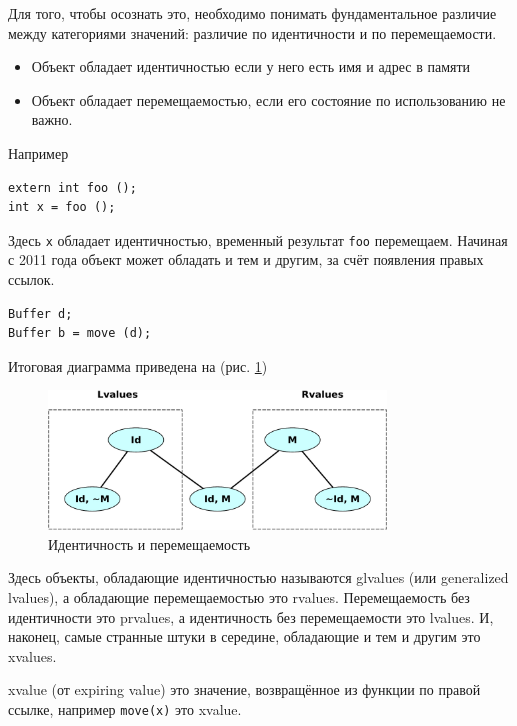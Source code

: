\documentclass[a4paper,12pt,oneside]{article}
\begin{document}
Для того, чтобы осознать это, необходимо понимать фундаментальное различие между категориями значений: различие по идентичности и по перемещаемости.

\begin{itemize}
\item Объект обладает идентичностью если у него есть имя и адрес в памяти
\item Объект обладает перемещаемостью, если его состояние по использованию не важно.
\end{itemize}

Например

\begin{lstlisting}
extern int foo ();
int x = foo (); 
\end{lstlisting}

Здесь \lstinline!x! обладает идентичностью, временный результат \lstinline!foo! перемещаем.
Начиная с 2011 года объект может обладать и тем и другим, за счёт появления правых ссылок.

\begin{lstlisting}
Buffer d;
Buffer b = move (d);
\end{lstlisting}

Итоговая диаграмма приведена на (рис. \ref{fig:rvref-identity})

\begin{figure}[ht]
\centering
\includegraphics[width=0.8\textwidth]{illustrations/rvref-identity-crop.pdf}
\caption{Идентичность и перемещаемость}
\label{fig:rvref-identity}
\end{figure}

Здесь объекты, обладающие идентичностью называются glvalues (или generalized lvalues), а обладающие  перемещаемостью это rvalues. Перемещаемость без идентичности это prvalues, а идентичность без перемещаемости это lvalues. И, наконец, самые странные штуки в середине, обладающие и тем и другим это xvalues.

xvalue (от expiring value) это значение, возвращённое из функции по правой ссылке, например \lstinline!move(x)! это xvalue.
\end{document}
